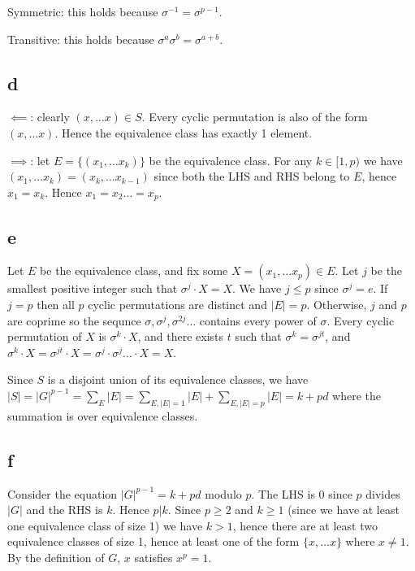 \documentclass{article}
\def\inv{{-1}}
\begin{document}
Symmetric: this holds because $\sigma^\inv = \sigma^{p-1}$.

Transitive: this holds because $\sigma^a \sigma^b = \sigma^{a+b}$.

\subsection*{d}

$\impliedby$: clearly $(x, \ldots x) \in S$. Every cyclic permutation is also of the form $(x, \ldots x)$. Hence the equivalence class has exactly 1 element.

$\implies$: let $E = \{(x_1, \ldots x_k)\}$ be the equivalence class. For any $k \in [1, p)$ we have $(x_1, \ldots x_k) = (x_k, \ldots x_{k-1})$ since both the LHS and RHS belong to $E$, hence $x_1 = x_k$. Hence $x_1 = x_2 \ldots = x_p$. 

\subsection*{e}

Let $E$ be the equivalence class, and fix some $X = (x_1, \ldots x_p) \in E$. Let $j$ be the smallest positive integer such that $\sigma^j \cdot X = X$. We have $j \le p$ since $\sigma^j = e$. If $j = p$ then all $p$ cyclic permutations are distinct and $|E| = p$. Otherwise, $j$ and $p$ are coprime so the sequnce $\sigma, \sigma^j, \sigma^{2j} \ldots$ contains every power of $\sigma$. Every cyclic permutation of $X$ is $\sigma^k \cdot X$, and there exists $t$ such that $\sigma^k = \sigma^{jt}$, and $\sigma^k \cdot X = \sigma^{jt} \cdot X = \sigma^j \cdot \sigma^j \ldots \cdot X = X$.

Since $S$ is a disjoint union of its equivalence classes, we have $|S| = |G|^{p-1} = \sum_E |E| = \sum_{E, |E| = 1} |E| + \sum_{E, |E| = p} |E| = k + pd$ where the summation is over equivalence classes. 

\subsection*{f}

Consider the equation $|G|^{p-1} = k + pd$ modulo $p$. The LHS is $0$ since $p$ divides $|G|$ and the RHS is $k$. Hence $p | k$. Since $p \ge 2$ and $k \ge 1$ (since we have at least one equivalence class of size 1) we have $k > 1$, hence there are at least two equivalence classes of size 1, hence at least one of the form $\{x, \ldots x\}$ where $x \ne 1$. By the definition of $G$, $x$ satisfies $x^p = 1$.
\end{document}
